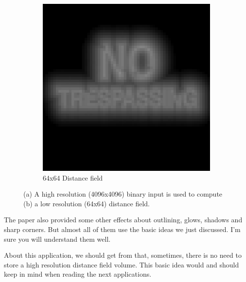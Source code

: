 \begin{figure}
\begin{subfigure}[t]{.48\textwidth}
		\includegraphics[width=1.0\textwidth]{graphics/df/distance-field-of-glyph}
		\caption{64x64 Distance field}
	\end{subfigure}
	\caption{(a) A high resolution (4096x4096) binary input is used to compute (b) a low resolution (64x64) distance field.}
	\label{f:glyph-distance-field}
\end{figure}


The paper also provided some other effects about outlining, glows, shadows and sharp corners. But almost all of them use the basic ideas we just discussed. I'm sure you will understand them well.

About this application, we should get from that, sometimes, there is no need to store a high resolution distance field volume. This basic idea would and should keep in mind when reading the next applications.   


